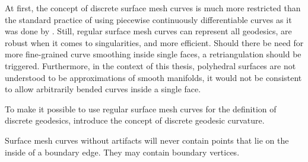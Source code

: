 \documentclass{stdlocal}
\begin{document}
  At first, the concept of discrete surface mesh curves is much more restricted than the standard practice of using piecewise continuously differentiable curves as it was done by \textcite{polthier2006}.
  Still, regular surface mesh curves can represent all geodesics, are robust when it comes to singularities, and more efficient.
  Should there be need for more fine-grained curve smoothing inside single faces, a retriangulation should be triggered.
  Furthermore, in the context of this thesis, polyhedral surfaces are not understood to be approximations of smooth manifolds, it would not be consistent to allow arbitrarily bended curves inside a single face.

  \begin{lemma}

  \end{lemma}

  To make it possible to use regular surface mesh curves for the definition of discrete geodesics, \textcite{polthier2006} introduce the concept of discrete geodesic curvature.


  Surface mesh curves without artifacts will never contain points that lie on the inside of a boundary edge.
  They may contain boundary vertices.
\end{document}
